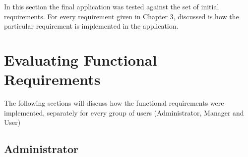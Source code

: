 \documentclass[a4paper,11pt,twoside]{report}
\theoremstyle{definition}
\begin{document}
In this section the final application was tested against the set of initial requirements. For every requirement given in Chapter 3, discussed is how the particular requirement is implemented in the application.

\section{Evaluating Functional Requirements}

The following sections will discuss how the functional requirements were implemented, separately for every group of users (Administrator, Manager and User)

\subsection{Administrator}
\end{document}
